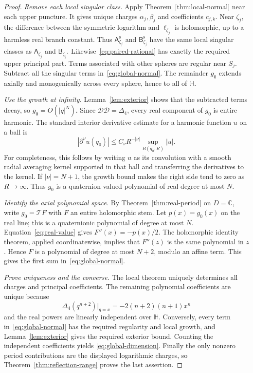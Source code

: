 \documentclass[11pt,a4paper]{article}
\numberwithin{equation}{section}
\theoremstyle{definition}
\theoremstyle{remark}
\newcommand{\C}{\mathbb C}
\newcommand{\HH}{\mathbb H}
\newcommand{\T}{\mathcal T}
\newcommand{\D}{\mathcal D}
\newcommand{\Lap}{\Delta_4}
\newcommand{\Adef}{\mathsf A}
\newcommand{\Bdef}{\mathsf B}
\newcommand{\Asym}{\mathsf A^{\mathrm s}}
\newcommand{\Bsym}{\mathsf B^{\mathrm s}}
\begin{document}
\begin{proof}
\emph{Remove each local singular class.}
Apply Theorem~\ref{thm:local-normal} near each upper puncture.
It gives unique charges $\alpha_j,\beta_j$ and coefficients $c_{j,k}$.
Near $\zeta_j$, the difference between the symmetric logarithm and
$\ell_{\zeta_j}$ is holomorphic, up to a harmless real branch constant.
Thus $\Asym_{\zeta_j}$ and $\Bsym_{\zeta_j}$ have the same local
singular classes as $\Adef_{\zeta_j}$ and $\Bdef_{\zeta_j}$.
Likewise~\eqref{eq:paired-rational} has exactly the required upper
principal part. Terms associated with other spheres are regular near
$S_j$. Subtract all the singular terms in~\eqref{eq:global-normal}.
The remainder $g_0$ extends axially and monogenically across every
sphere, hence to all of $\HH$.

\emph{Use the growth at infinity.}
Lemma~\ref{lem:exterior} shows that the subtracted terms decay, so
$g_0=O(|q|^N)$. Since $\overline{\D}\D=\Lap$, every real component of
$g_0$ is entire harmonic. The standard interior derivative estimate
for a harmonic function $u$ on a ball is
\[
 |\partial^\nu u(q_0)|\le C_\nu R^{-|\nu|}
                 \sup_{B(q_0,R)}|u|.
\]
For completeness, this follows by writing $u$ as its convolution with
a smooth radial averaging kernel supported in that ball and
transferring the derivatives to the kernel. If $|\nu|=N+1$, the growth
bound makes the right side tend to zero as $R\to\infty$.
Thus $g_0$ is a quaternion-valued polynomial of real degree at most $N$.

\emph{Identify the axial polynomial space.}
By Theorem~\ref{thm:real-period} on $D=\C$, write $g_0=\T F$ with
$F$ an entire holomorphic stem. Let $p(x)=g_0(x)$ on the real line;
this is a quaternionic polynomial of degree at most $N$.
Equation~\eqref{eq:real-value} gives $F''(x)=-p(x)/2$.
The holomorphic identity theorem, applied coordinatewise, implies that
$F''(z)$ is the same polynomial in $z$. Hence $F$ is a polynomial of
degree at most $N+2$, modulo an affine term. This gives the first sum
in~\eqref{eq:global-normal}.

\emph{Prove uniqueness and the converse.}
The local theorem uniquely determines all charges and principal
coefficients. The remaining polynomial coefficients are unique because
\[
 \Lap(q^{n+2})\big|_{q=x}=-2(n+2)(n+1)x^n
\]
and the real powers are linearly independent over $\HH$.
Conversely, every term in~\eqref{eq:global-normal} has the required
regularity and local growth, and Lemma~\ref{lem:exterior} gives the
required exterior bound. Counting the independent coefficients yields
\eqref{eq:global-dimension}. Finally the only nonzero period contributions
are the displayed logarithmic charges, so
Theorem~\ref{thm:reflection-range} proves the last assertion.
\end{proof}
\end{document}
